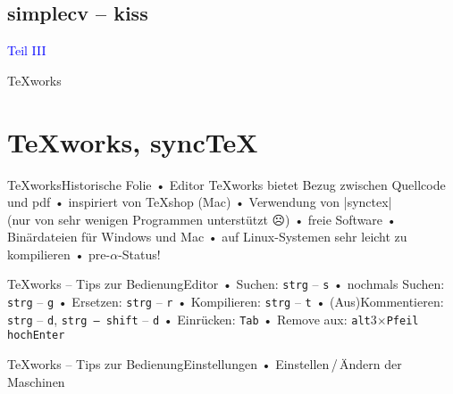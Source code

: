 \subsection{simplecv – kiss}

\begin{frame}[c]
\centerline{\large \textcolor{blue}{Teil III}}
\centerline{\TeX works}
\end{frame}

\section{\TeX works, sync\TeX }
\begin{frame}{\TeX works}{Historische Folie}
• Editor \TeX works bietet Bezug zwischen Quellcode und pdf
• inspiriert von \TeX shop (Mac)
• Verwendung von |synctex|\\%
(nur von sehr wenigen Programmen unterstützt  ☹)
• freie Software
• Binärdateien für Windows und Mac
• auf Linux-Systemen sehr leicht zu kompilieren
• pre-$\alpha$-Status!
\•
\end{frame}

\newcommand{\comb}[2]{\texttt{#1} – \texttt{#2}}


\begin{frame}{\TeX works – Tips zur Bedienung}{Editor}
• Suchen: \comb{strg}s
• nochmals Suchen: \comb{strg}g
• Ersetzen: \comb{strg}r
• Kompilieren: \comb{strg}t
• (Aus)Kommentieren: \comb{strg}d, \comb{strg – shift}d
• Einrücken: \texttt{Tab}
• Remove aux: \texttt{alt}3$\times$\texttt{Pfeil hoch}\texttt{Enter}
\• 
\end{frame}


\begin{frame}{\TeX works – Tips zur Bedienung}{Einstellungen}
• Einstellen\,/\,Ändern der Maschinen
\•
\end{frame}
